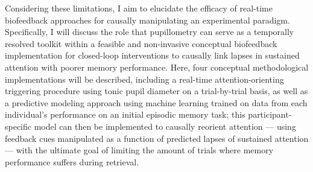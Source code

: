 Considering these limitations, I aim to elucidate the efficacy of real-time biofeedback approaches for causally manipulating an experimental paradigm. Specifically, I will discuss the role that pupillometry can serve as a temporally resolved toolkit within a feasible and non-invasive conceptual biofeedback implementation for closed-loop interventions to causally link lapses in sustained attention with poorer memory performance. Here, four conceptual methodological implementations will be described, including a real-time attention-orienting triggering procedure using tonic pupil diameter on a trial-by-trial basis, as well as a predictive modeling approach using machine learning trained on data from each individual's performance on an initial episodic memory task; this participant-specific model can then be implemented to causally reorient attention --- using feedback cues manipulated as a function of predicted lapses of sustained attention --- with the ultimate goal of limiting the amount of trials where memory performance suffers during retrieval.

